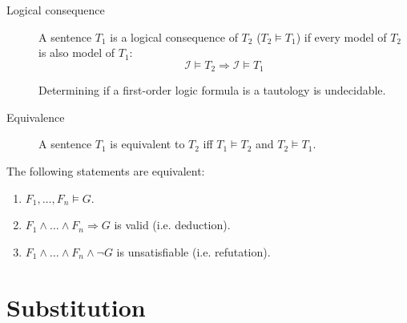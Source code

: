 \begin{description}
    \item[Logical consequence] 
        A sentence $T_1$ is a logical consequence of $T_2$ ($T_2 \models T_1$) if
        every model of $T_2$ is also model of $T_1$:
        \[ \mathcal{I} \models T_2 \Rightarrow \mathcal{I} \models T_1 \]

        \begin{theorem}
            Determining if a first-order logic formula is a tautology is undecidable.
        \end{theorem}

    \item[Equivalence] 
        A sentence $T_1$ is equivalent to $T_2$ iff $T_1 \models T_2$ and $T_2 \models T_1$.
\end{description}

\begin{theorem}
    The following statements are equivalent:
    \begin{enumerate}
        \item $F_1, \dots, F_n \models G$.
        \item $F_1 \land \dots \land F_n \Rightarrow G$ is valid (i.e. deduction).
        \item $F_1 \land \dots \land F_n \land \lnot G$ is unsatisfiable (i.e. refutation).
    \end{enumerate}
\end{theorem}


\section{Substitution}

